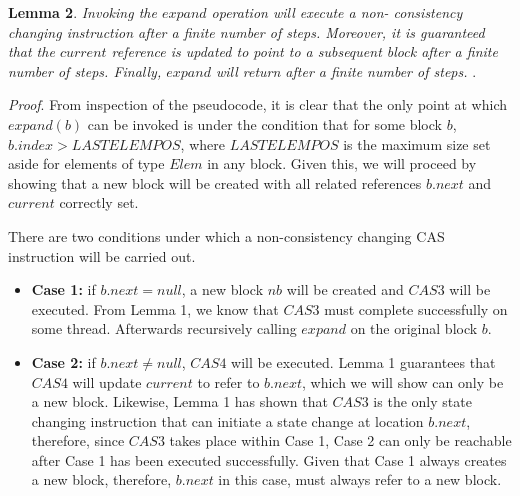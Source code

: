 \documentclass[runningheads,a4paper]{llncs}
\begin{document}
\textbf{Lemma 2}. \textit{Invoking the $expand$ operation will execute a non-
consistency changing instruction after a finite number of steps. Moreover, it
is guaranteed that the $current$ reference is updated to point to a subsequent
block after a finite number of steps. Finally, $expand$ will return after a
finite number of steps.
}.

%
%

\textit{Proof}. From inspection of the pseudocode, it is clear that the only
point at which $expand(b)$ can be invoked is under the condition that for some
block $b$, $b.index > LASTELEMPOS$, where $LASTELEMPOS$ is the maximum size
set aside for elements of type $Elem$ in any block. Given this, we will proceed 
by showing that a new block will be created with all related references 
$b.next$ and $current$ correctly set.

There are two conditions under which a non-consistency changing CAS
instruction will be carried out. 

\begin{itemize} 
\item \textbf{Case 1:} if $b.next=null$, a new block $nb$ will
be created and $CAS3$ will be executed. From Lemma 1, we know that $CAS3$
must complete successfully on some thread. Afterwards recursively calling 
$expand$ on the original block $b$.
\item \textbf{Case 2:} if $b.next \neq null$, $CAS4$ will be executed. 
Lemma 1 guarantees that $CAS4$ will update $current$ to refer to $b.next$, 
which we will show can only be a new block. Likewise, Lemma 1 has shown that 
$CAS3$ is the only state changing instruction that can initiate a state change 
at location $b.next$, therefore, since $CAS3$ takes place within Case 1,  
Case 2 can only be reachable after Case 1 has been executed successfully. Given 
that Case 1 always creates a new block, therefore, $b.next$ in this case, must 
always refer to a new block.
\end{itemize}
\end{document}
